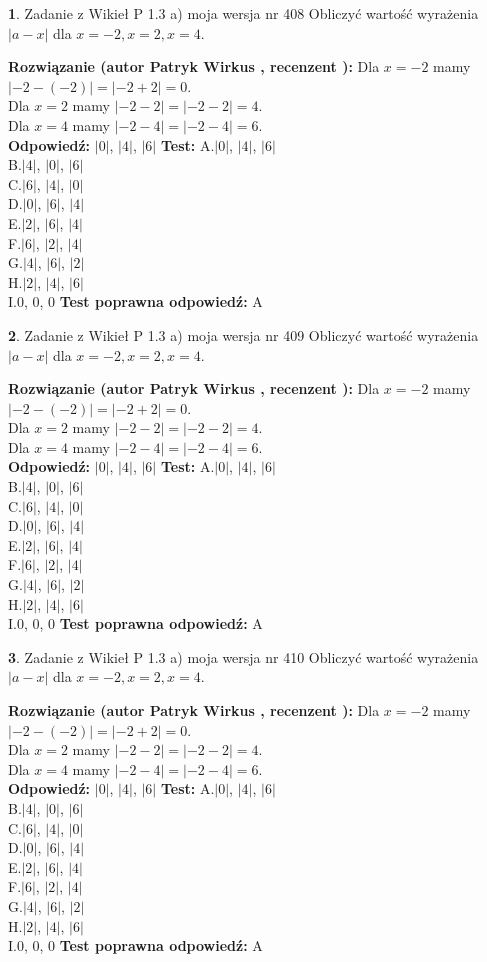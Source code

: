 \documentclass[12pt, a4paper]{article}
\theoremstyle{definition} %
\newtheorem{zad}{}
\newcommand{\zadStart}[1]{\begin{zad}#1\newline}
\newcommand{\zadStop}{\end{zad}}
\newcommand{\rozwStart}[2]{\noindent \textbf{Rozwiązanie (autor #1 , recenzent #2): }\newline}
\newcommand{\rozwStop}{\newline}
\newcommand{\odpStart}{\noindent \textbf{Odpowiedź:}\newline}
\newcommand{\odpStop}{\newline}
\newcommand{\testStart}{\noindent \textbf{Test:}\newline}
\newcommand{\testStop}{\newline}
\newcommand{\kluczStart}{\noindent \textbf{Test poprawna odpowiedź:}\newline}
\newcommand{\kluczStop}{\newline}
\begin{document}
\zadStart{Zadanie z Wikieł P 1.3 a) moja wersja nr 408}
Obliczyć wartość wyrażenia $|a - x|$ dla $x=-2,x=2,x=4$.
\zadStop
\rozwStart{Patryk Wirkus}{}
Dla $x = -2$ mamy $|-2 - (-2)| = |-2 + 2| = 0$.\\
Dla $x = 2$ mamy $|-2 - 2| = |-2 - 2| = 4$.\\
Dla $x = 4$ mamy $|-2 - 4| = |-2 - 4| = 6$.\\
\rozwStop
\odpStart
$|0|$, $|4|$, $|6|$
\odpStop
\testStart
A.$|0|$, $|4|$, $|6|$\\
B.$|4|$, $|0|$, $|6|$\\
C.$|6|$, $|4|$, $|0|$\\
D.$|0|$, $|6|$, $|4|$\\
E.$|2|$, $|6|$, $|4|$\\
F.$|6|$, $|2|$, $|4|$\\
G.$|4|$, $|6|$, $|2|$\\
H.$|2|$, $|4|$, $|6|$\\
I.$0$, $0$, $0$
\testStop
\kluczStart
A
\kluczStop



\zadStart{Zadanie z Wikieł P 1.3 a) moja wersja nr 409}
Obliczyć wartość wyrażenia $|a - x|$ dla $x=-2,x=2,x=4$.
\zadStop
\rozwStart{Patryk Wirkus}{}
Dla $x = -2$ mamy $|-2 - (-2)| = |-2 + 2| = 0$.\\
Dla $x = 2$ mamy $|-2 - 2| = |-2 - 2| = 4$.\\
Dla $x = 4$ mamy $|-2 - 4| = |-2 - 4| = 6$.\\
\rozwStop
\odpStart
$|0|$, $|4|$, $|6|$
\odpStop
\testStart
A.$|0|$, $|4|$, $|6|$\\
B.$|4|$, $|0|$, $|6|$\\
C.$|6|$, $|4|$, $|0|$\\
D.$|0|$, $|6|$, $|4|$\\
E.$|2|$, $|6|$, $|4|$\\
F.$|6|$, $|2|$, $|4|$\\
G.$|4|$, $|6|$, $|2|$\\
H.$|2|$, $|4|$, $|6|$\\
I.$0$, $0$, $0$
\testStop
\kluczStart
A
\kluczStop



\zadStart{Zadanie z Wikieł P 1.3 a) moja wersja nr 410}
Obliczyć wartość wyrażenia $|a - x|$ dla $x=-2,x=2,x=4$.
\zadStop
\rozwStart{Patryk Wirkus}{}
Dla $x = -2$ mamy $|-2 - (-2)| = |-2 + 2| = 0$.\\
Dla $x = 2$ mamy $|-2 - 2| = |-2 - 2| = 4$.\\
Dla $x = 4$ mamy $|-2 - 4| = |-2 - 4| = 6$.\\
\rozwStop
\odpStart
$|0|$, $|4|$, $|6|$
\odpStop
\testStart
A.$|0|$, $|4|$, $|6|$\\
B.$|4|$, $|0|$, $|6|$\\
C.$|6|$, $|4|$, $|0|$\\
D.$|0|$, $|6|$, $|4|$\\
E.$|2|$, $|6|$, $|4|$\\
F.$|6|$, $|2|$, $|4|$\\
G.$|4|$, $|6|$, $|2|$\\
H.$|2|$, $|4|$, $|6|$\\
I.$0$, $0$, $0$
\testStop
\kluczStart
A
\kluczStop
\end{document}

